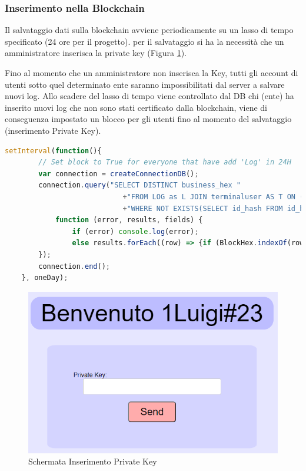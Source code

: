 \documentclass[11pt,a4paper,titlepage,twoside,openright]{report}
\begin{document}
\subsubsection{Inserimento nella Blockchain}
Il salvataggio dati sulla blockchain avviene periodicamente su un lasso di tempo specificato (24 ore per il progetto).
per il salvataggio si ha la necessità che un amministratore inserisca la private key (Figura \ref{fig:Input_Key}).

Fino al momento che un amministratore non inserisca la Key, tutti gli account di utenti sotto quel determinato ente saranno impossibilitati dal server a salvare nuovi log. Allo scadere del lasso di tempo viene controllato dal DB chi (ente) ha inserito nuovi log che non sono stati certificato dalla blockchain, viene di conseguenza impostato un blocco per gli utenti fino al momento del salvataggio (inserimento Private Key).

\begin{lstlisting}[language=JavaScript]
	setInterval(function(){
		// Set block to True for everyone that have add 'Log' in 24H
		var connection = createConnectionDB();
		connection.query("SELECT DISTINCT business_hex "
							+"FROM LOG as L JOIN terminaluser AS T ON (L.UserName= T.UserName) JOIN id_hash AS H ON(T.Business_Hex= H.Business)"
							+"WHERE NOT EXISTS(SELECT id_hash FROM id_hash WHERE id_hash= L.ID_HASH)",
		  	function (error, results, fields) {
		  		if (error) console.log(error);
		  		else results.forEach((row) => {if (BlockHex.indexOf(row.business_hex)===-1) BlockHex.push(row.business_hex);});
		});
		connection.end();
	}, oneDay);
\end{lstlisting}

\begin{figure}[h]
	\includegraphics[width=\textwidth]{Input_Key}
	\centering
	\caption{Schermata Inserimento Private Key}
	\label{fig:Input_Key}
\end{figure}
\end{document}

